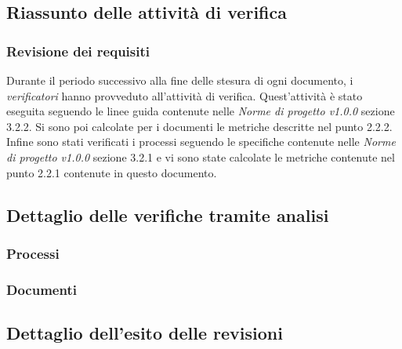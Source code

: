 \subsection{Riassunto delle attività di verifica}
\subsubsection{Revisione dei requisiti}
Durante il periodo successivo alla fine delle stesura di ogni documento, i \emph{verificatori}  hanno provveduto all'attività di verifica. Quest'attività è stato eseguita seguendo le linee guida contenute nelle \emph{Norme di progetto v1.0.0} sezione 3.2.2.
Si sono poi calcolate per i documenti le metriche descritte nel punto 2.2.2.
Infine sono stati verificati i processi seguendo le specifiche contenute nelle \emph{Norme di progetto v1.0.0} sezione 3.2.1 e vi sono state calcolate le metriche contenute nel punto 2.2.1 contenute in questo documento.
\subsection{Dettaglio delle verifiche tramite analisi}
\subsubsection{Processi}
\subsubsection{Documenti}
\subsection{Dettaglio dell’esito delle revisioni}
\pagebreak